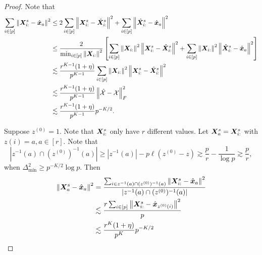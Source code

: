 \documentclass[lettersize,onecolumn,journal]{IEEEtran}
\theoremstyle{definition}
\theoremstyle{definition}
\newcommand{\off}[1]{\left[#1\right]}
\begin{document}
\begin{proof}
Note that 
\begin{align}
     \sum_{i \in [p]} \onorm{\mX_{i:}^s - \hat \mx_a}^2 &\leq  2\sum_{i \in [p]} \onorm{\mX_{i:}^s - \hat \mX_{i:}^s}^2 + \sum_{i \in [p]} \onorm{\hat \mX_{i:}^s - \hat \mx_a }^2 \\
    & \leq \frac{2}{\min_{i \in [p]} \onorm{\mX_{i:}}^2}  \off{ \sum_{i \in [p]} \onorm{\mX_{i:}}^2  \onorm{\mX_{i:}^s - \hat \mX_{i:}^s}^2 +  \sum_{i \in [p]}  \onorm{\mX_{i:}}^2  \onorm{\hat \mX_{i:}^s - \hat \mx_a }^2 }\\
    & \lesssim \frac{r^{K-1} (1 + \eta)}{p^{K-1}} \sum_{i \in [p]} \onorm{\mX_{i:}}^2  \onorm{\mX_{i:}^s - \hat \mX_{i:}^s}^2 \\
    & \lesssim  \frac{r^{K-1} (1 + \eta)}{p^{K-1}}  \onorm{\hat  \tX - \tX}_F^2 \\
    & \lesssim \frac{r^{K-1} (1 + \eta)}{p^{K-1}} p^{-K/2}.
\end{align}

Suppose $z^{(0)} = 1$.  Note that $\bm X^s_{i:}$ only have $r$ different values. Let $\bm X_{a}^s = \bm X^s_{i:}$ with $z(i) = a, a \in [r]$. Note that 
\begin{equation}
    |z^{-1}(a) \cap (z^{(0)})^{-1} (a)| \geq |z^{-1}(a)| - p\ell(z^{(0)} - z) \gtrsim \frac{p}{r} - \frac{1}{\log p} \gtrsim \frac{p}{r},
\end{equation}
when $\Delta_{\min}^2 \geq p^{-K/2} \log p$. Then
\begin{align}
    \left\lVert\bm X_a^s - \hat {\bm x}_a\right\rVert^2 &= \frac{ \sum_{i \in z^{-1}(a) \cap (z^{(0)})^{-1} (a) } \left\lVert \bm X_{i:}^s - \hat {\bm x}_a\right\rVert^2 }{|z^{-1}(a) \cap (z^{(0)})^{-1} (a) |} \\
    & \lesssim \frac{ r \sum_{i \in [p]} \left\lVert\bm X_{i:}^s - \hat {\bm x}_{z^{(0)}(i)}\right\rVert^2 }{ p}\\
    & \lesssim \frac{r^K(1 + \eta)}{p^{K}} p^{-K/2} 
\end{align}


\end{proof}
\end{document}
